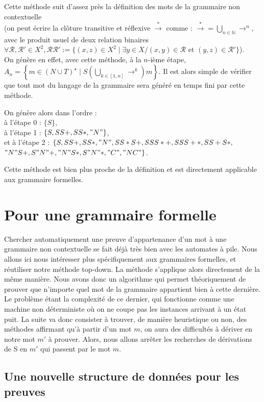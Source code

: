 \documentclass[a4paper,12pt]{article}
\begin{document}
Cette méthode suit d'assez près la définition des mots de la grammaire non contextuelle\\
(on peut écrire la clôture transitive et réflexive $\overset{*}{\rightarrow}$ comme :
$\overset{*}{\rightarrow} = \bigcup_{n \in \mathbb{N}} \rightarrow ^n$, avec le produit usuel de deux relation binaires $\forall \mathcal{R}, \mathcal{R}' \in X^2, \mathcal{R} \mathcal{R'} := \{(x,z) \in X^2 \mid \exists y \in X / (x,y) \in \mathcal{R} \text{ et } (y,z) \in \mathcal{R}'\} $).\\
On génère en effet, avec cette méthode, à la $n$-ième étape, $A_n = \left\{m \in (N \cup T)^\star \mid  S \left(\bigcup_{k \in [1,n]} \rightarrow^k\right) m\right\}$.
Il est alors simple de vérifier que tout mot du langage de la grammaire sera généré en temps fini par cette méthode.

On génère alors dans l'ordre :\\
à l'étape 0 : $\{S\}$, \\
à l'étape 1 : $\{S,SS+,SS*,"N"\}$,\\
et à l'étape 2 : $\{S,SS+,SS*,"N",SS*S+,SSS*+,SSS+*,SS+S*,$ \\
$"N"S+,S"N"+,"N"S*,S"N"*,"C","NC"\}$.

Cette méthode est bien plus proche de la définition et est directement applicable aux grammaire formelles.

\section{Pour une grammaire formelle}

Chercher automatiquement une preuve d'appartenance d'un mot à une grammaire non contextuelle se fait déjà très bien avec les automates à pile.
Nous allons ici nous intéresser plus spécifiquement aux grammaires formelles, et réutiliser notre méthode top-down.
La méthode s'applique alors directement de la même manière.
Nous avons donc un algorithme qui permet théoriquement de prouver que n'importe quel mot de la grammaire appartient bien à cette dernière.
Le problème étant la complexité de ce dernier, qui fonctionne comme une machine non déterministe où on ne coupe pas les instances arrivant à un état puit.
La suite va donc consister à trouver, de manière heuristique ou non, des méthodes affirmant qu'à partir d'un mot $m$, on aura des difficultés à dériver en notre mot $m'$ à prouver.
Alors, nous allons arrêter les recherches de dérivations de S en $m'$ qui passent par le mot $m$.

\subsection{Une nouvelle structure de données pour les preuves}
\end{document}
